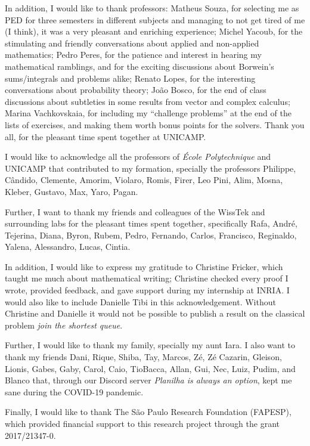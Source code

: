 In addition, I would like to thank professors:
%
Matheus Souza, for selecting me as PED for three semesters in different subjects and managing to not get tired of me (I think), it was a very pleasant and enriching experience;
%
Michel Yacoub, for the stimulating and friendly conversations about applied and non-applied mathematics;
%
Pedro Peres, for the patience and interest in hearing my mathematical ramblings, and for the exciting discussions about Borwein's sums/integrals and problems alike;
%
Renato Lopes, for the interesting conversations about probability theory;
%
João Bosco, for the end of class discussions about subtleties in some results from vector and complex calculus;
%
Marina Vachkovskaia, for including my ``challenge problems'' at the end of the lists of exercises, and making them worth bonus points for the solvers.
%
Thank you all, for the pleasant time spent together at UNICAMP.

I would like to acknowledge all the professors of \textit{École Polytechnique} and UNICAMP that contributed to my formation, specially the professors Philippe, Cândido, Clemente, Amorim, Violaro, Romis, Firer, Leo Pini, Alim, Mosna, Kleber, Gustavo, Max, Yaro, Pagan.

Further, I want to thank my friends and colleagues of the WissTek and surrounding labs for the pleasant times spent together, specifically Rafa, André, Tejerina, Diana, Byron, Rubem, Pedro, Fernando, Carlos, Francisco, Reginaldo, Yalena, Alessandro, Lucas, Cintia.

In addition, I would like to express my gratitude to Christine Fricker, which taught me much about mathematical writing; Christine checked every proof I wrote, provided feedback, and gave support during my internship at INRIA.
%
I would also like to include Danielle Tibi in this acknowledgement. Without Christine and Danielle it would not be possible to publish a result on the classical problem \textit{join the shortest queue}.

Further, I would like to thank my family, specially my aunt Iara. I also want to thank my friends Dani, Rique, Shiba, Tay, Marcos, Zé, Zé Cazarin, Gleison, Lionis, Gabes, Gaby, Carol, Caio, TioBacca, Allan, Gui, Nec, Luiz, Pudim, and Blanco that, through our Discord server \textit{Planilha is always an option}, kept me sane during the COVID-19 pandemic.

Finally, I would like to thank The São Paulo Research Foundation (FAPESP), which provided financial support to this research project through the grant 2017/21347-0.
\newpage

